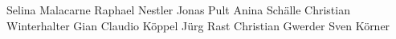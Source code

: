 Selina Malacarne
Raphael Nestler
Jonas Pult
Anina Schälle
Christian Winterhalter
Gian Claudio Köppel
Jürg Rast
Christian Gwerder
Sven Körner
